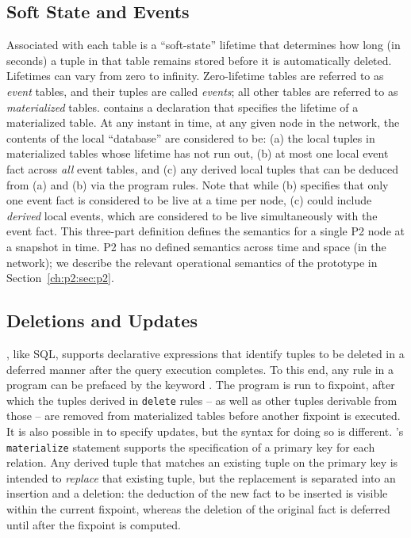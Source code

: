 \subsection{Soft State and Events}

Associated with each \OVERLOG table is a ``soft-state'' lifetime that
determines how long (in seconds) a tuple in that table remains stored before it
is automatically deleted.  Lifetimes can vary from zero to infinity.
Zero-lifetime tables are referred to as {\em event} tables, and their tuples
are called \emph{events}; all other tables are referred to as {\em
materialized} tables.  \OVERLOG contains a  declaration that
specifies the lifetime of a materialized table.  At any instant in time, at any
given node in the network, the contents of the local \OVERLOG ``database'' are
considered to be: (a) the local tuples in materialized tables whose lifetime
has not run out, (b) at most one local event fact across {\em all} event
tables, and (c) any derived local tuples that can be deduced from (a) and (b)
via the program rules.  Note that while (b) specifies that only one event fact
is considered to be live at a time per node, (c) could include {\em derived}
local events, which are considered to be live simultaneously with the event
fact.  This three-part definition defines the semantics for a single P2 node at
a snapshot in time.  P2 has no defined semantics across time and space (in the
network); we describe the relevant operational semantics of the prototype in
Section~\ref{ch:p2:sec:p2}.
     
\subsection{Deletions and Updates}

\OVERLOG, like SQL, supports declarative expressions that identify tuples to be
deleted in a deferred manner after the query execution completes.  To this end, any
\OVERLOG rule in a program can be prefaced by the keyword .  The
program is run to fixpoint, after which the tuples derived in {\tt delete}
rules -- as well as other tuples derivable from those -- are removed from
materialized tables before another fixpoint is executed.  It is also possible
in \OVERLOG to specify updates, but the syntax for doing so is different.
\OVERLOG's {\tt materialize} statement supports the specification of a primary
key for each relation.  Any derived tuple that matches an existing tuple on the
primary key is intended to {\em replace} that existing tuple, but the
replacement is separated into an insertion and a deletion: the deduction of the
new fact to be inserted is visible within the current fixpoint, whereas the
deletion of the original fact is deferred until after the fixpoint is computed.

